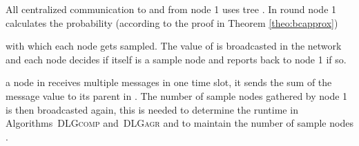 \documentclass[11pt]{article}
\newif\iffull
\newif\ifshort
\begin{document}
All centralized communication to and from node 1 uses tree . In round   \iffull(Line \ref{line:BCprobstart} to \ref{line:BCprobend})\fi node 1 calculates the probability  (according to the proof in Theorem \ref{theo:bcapprox})

with which each node gets sampled. The value of  is broadcasted in the network and each node decides if itself is a sample node and reports back to node 1 if so.
\ifshort
If 
\fi
\iffull
 In Line \ref{line:BCaccsamples}, if 
\fi
 a node in  receives multiple messages in one time slot, it sends the sum of the message value to its parent in . The number of sample nodes  gathered by node 1 is then broadcasted again, this is needed to determine the runtime  in Algorithms\iffull~\ref{alg:DLGcomp}\fi~\textsc{DLGcomp} and\iffull~\ref{alg:DLGagr}\fi~\textsc{DLGagr} and to maintain the number of sample nodes .
\end{document}
